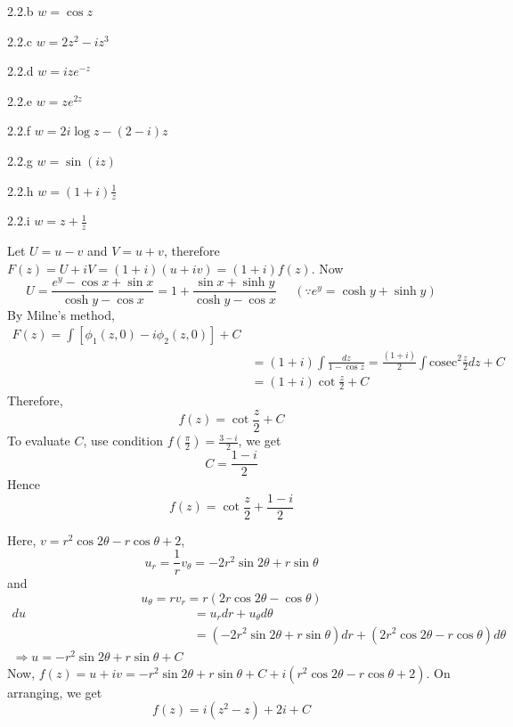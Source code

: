 \begin{Solution}{2.2.b}
                $w=\cos z$
        
\end{Solution}
\begin{Solution}{2.2.c}
        $w=2z^{2}-iz^{3}$
        
\end{Solution}
\begin{Solution}{2.2.d}
        $w=ize^{-z}$
        
\end{Solution}
\begin{Solution}{2.2.e}
        $w=ze^{2z}$
        
\end{Solution}
\begin{Solution}{2.2.f}
        $w=2i\log z-(2-i)z$
        
\end{Solution}
\begin{Solution}{2.2.g}
        $w=\sin(iz)$
        
\end{Solution}
\begin{Solution}{2.2.h}
        $w=(1+i)\frac{1}{z}$
        
\end{Solution}
\begin{Solution}{2.2.i}
        $w=z+\frac{1}{z}$
        
\end{Solution}
\begin{Solution}{2.3}
Let $U=u-v$ and $V=u+v$, therefore $F(z)=U+iV =(1+i)(u+iv)=(1+i)f(z)$. Now
\[U= \frac{e^y-\cos x+ \sin x}{\cosh y- \cos x} = 1+\frac{\sin x+ \sinh y}{\cosh y- \cos x}\;\;\;\;\;(\because e^y=\cosh y + \sinh y)\]
By Milne's method,
\begin{align*}
        F(z) = \int [\phi_1(z,0)-i\phi_2(z,0)] +C\\
        &=(1+i) \int \frac{dz}{1-\cos z} = \frac{(1+i)}{2} \int \text{cosec}^2\frac{z}{2} dz +C\\
        &=(1+i) \cot \frac{z}{2}  + C
\end{align*}
Therefore,
\[f(z) = \cot  \frac{z}{2} + C \]
To evaluate $C$, use condition $f\left(\frac{\pi}{2}\right)=\frac{3-i}{2}$, we get
\[C=\frac{1-i}{2}\]
Hence
\[f(z) = \cot  \frac{z}{2} + \frac{1-i}{2} \]

\end{Solution}
\begin{Solution}{2.4}
Here, $v=r^2 \cos 2 \theta - r  \cos \theta + 2$,
\[u_r=\frac{1}{r}v_{\theta} = -2r^2\sin 2\theta + r\sin \theta\]
and
\[u_{\theta}=rv_{r} =r(2r\cos 2 \theta - \cos \theta)\]
\begin{align*}
        du &= u_rdr+u_{\theta}d\theta  \\
        &= (-2r^2\sin 2\theta + r\sin \theta)dr + (2r^2\cos 2 \theta - r\cos \theta)d\theta \\
        \Rightarrow u=-r^2\sin 2\theta +r \sin \theta +C
\end{align*}
Now, $f(z) = u+iv = -r^2\sin 2\theta +r \sin \theta +C + i(r^2 \cos 2 \theta - r  \cos \theta + 2)$. On arranging, we get
\[f(z) = i(z^2-z)+2i+C\]
\end{Solution}
